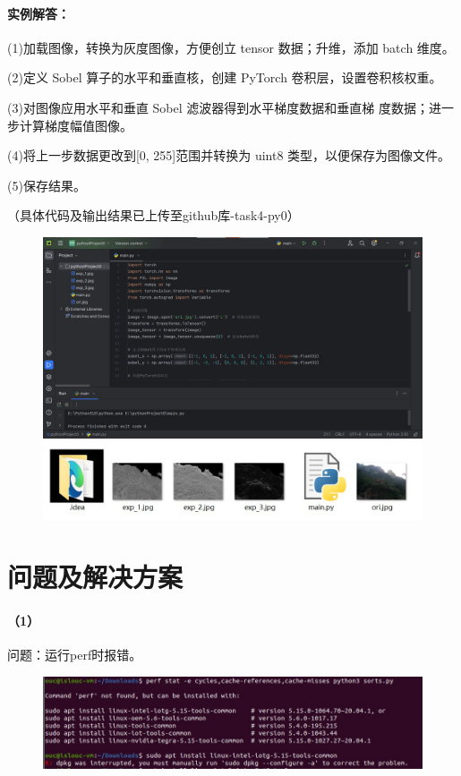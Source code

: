 \documentclass[a4paper, 12pt]{article}
\begin{document}
	\paragraph{实例解答：}
	
	(1)加载图像，转换为灰度图像，方便创立 tensor 数据；升维，添加
	batch 维度。
	
	(2)定义 Sobel 算子的水平和垂直核，创建 PyTorch 卷积层，设置卷积核权重。
	
	(3)对图像应用水平和垂直 Sobel 滤波器得到水平梯度数据和垂直梯
	度数据；进一步计算梯度幅值图像。
	
	(4)将上一步数据更改到[0, 255]范围并转换为 uint8 类型，以便保存为图像文件。
	
	(5)保存结果。
	
	（具体代码及输出结果已上传至github库-task4-py0）
	
	\begin{figure}[H]
		\centering
		\includegraphics[width=1\textwidth]{098.jpg}
		\includegraphics[width=1\textwidth]{099.jpg}
	\end{figure}
	
	\section{问题及解决方案}
	
	\paragraph{（1）}
	问题：运行perf时报错。
	
	\begin{figure}[h]
		\centering
		\includegraphics[width=1\textwidth]{100.jpg}
	\end{figure}
	
\end{document}
